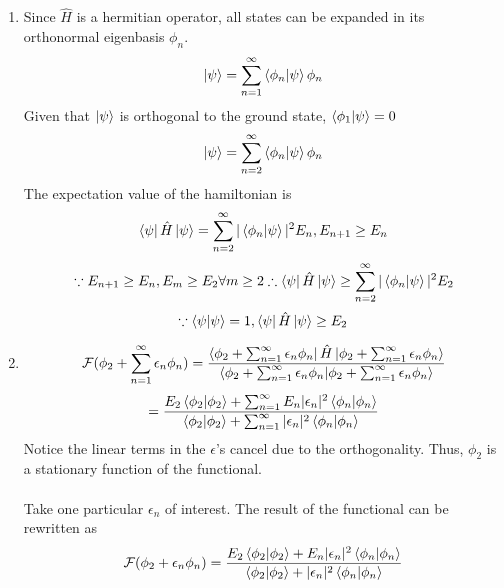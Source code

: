 \begin{sol}
\begin{enumerate}[label=\textbf{(\alph*)}]
\item
Since $\hat{H}$ is a hermitian operator, all states can be expanded in its orthonormal eigenbasis $\phi_n$.\\
\begin{equation}
    \ket\psi=\sum_{n=1}^\infty\braket{\phi_n}{\psi}\phi_n
\end{equation}
Given that $\ket\psi$ is orthogonal to the ground state, $\braket{\phi_1}{\psi}=0$
\begin{equation}
	\ket\psi=\sum_{n=2}^\infty\braket{\phi_n}{\psi}\phi_n
\end{equation} 
The expectation value of the hamiltonian is
\begin{equation}
	\bra{\psi}\hat{H}\ket{\psi}=\sum_{n=2}^\infty|\braket{\phi_n}{\psi}|^2E_n, E_{n+1}\geq E_n
\end{equation}
\begin{equation}
	\because E_{n+1}\geq E_n, E_m\geq E_2\forall m\geq 2\therefore \bra{\psi}\hat{H}\ket{\psi}\geq\sum_{n=2}^\infty|\braket{\phi_n}{\psi}|^2 E_2
\end{equation}
\begin{equation}
	\because \braket{\psi}{\psi}=1, \bra\psi\hat H\ket\psi\geq E_2
\end{equation}
\item
\begin{equation}
	\mathcal{F}(\phi_2+\sum_{n=1}^\infty\epsilon_n\phi_n)=\frac{\bra{\phi_2+\sum_{n=1}^\infty\epsilon_n\phi_n}\hat H\ket{\phi_2+\sum_{n=1}^\infty\epsilon_n\phi_n}}{\braket{\phi_2+\sum_{n=1}^\infty\epsilon_n\phi_n}{\phi_2+\sum_{n=1}^\infty\epsilon_n\phi_n}}
\end{equation} \begin{equation}
	=\frac{E_2\braket{\phi_2}{\phi_2}+\sum_{n=1}^\infty E_n|\epsilon_n|^2\braket{\phi_n}{\phi_n}}{\braket{\phi_2}{\phi_2}+\sum_{n=1}^\infty|\epsilon_n|^2\braket{\phi_n}{\phi_n}}
\end{equation}
Notice the linear terms in the $\epsilon$'s cancel due to the orthogonality.  Thus, $\phi_2$ is a stationary function of the functional.\\
\\
Take one particular $\epsilon_n$ of interest. The result of the functional can be rewritten as
\begin{equation}
	\mathcal{F}(\phi_2+\epsilon_n\phi_n)=\frac{E_2\braket{\phi_2}{\phi_2}+E_n|\epsilon_n|^2\braket{\phi_n}{\phi_n}}{\braket{\phi_2}{\phi_2}+|\epsilon_n|^2\braket{\phi_n}{\phi_n}}

\end{equation}
\end{enumerate}
\end{sol}
